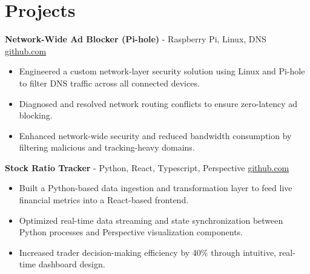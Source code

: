 \documentclass[11pt]{article}       %
\begin{document}

\vspace{-18.5pt}

\section*{Projects}

\textbf{Network-Wide Ad Blocker (Pi-hole)}{ - Raspberry Pi, Linux, DNS} \hfill \href{https://github.com/Monica20030707}{github.com} \\
\vspace{-9pt}
\begin{itemize}
  \item Engineered a custom network-layer security solution using Linux and Pi-hole to filter DNS traffic across all connected devices.
  \item Diagnosed and resolved network routing conflicts to ensure zero-latency ad blocking.
  \item Enhanced network-wide security and reduced bandwidth consumption by filtering malicious and tracking-heavy domains.
\end{itemize}

\textbf{Stock Ratio Tracker}{ - Python, React, Typescript, Perspective} \hfill \href{https://github.com/Monica20030707/tradingDashboard-UI}{github.com} \\
\vspace{-9pt}
\begin{itemize}
  \item Built a Python-based data ingestion and transformation layer to feed live financial metrics into a React-based frontend.
  \item Optimized real-time data streaming and state synchronization between Python processes and Perspective visualization components.
  \item Increased trader decision-making efficiency by 40\% through intuitive, real-time dashboard design.
\end{itemize}
\end{document}
